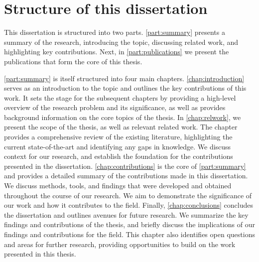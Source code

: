 \section{Structure of this dissertation}

This dissertation is structured into two parts.
\cref{part:summary} presents a summary of the research, introducing the topic, discussing related work, and highlighting key contributions.
Next, in \cref{part:publications} we present the publications that form the core of this thesis.

\cref{part:summary} is itself structured into four main chapters.
\cref{chap:introduction} serves as an introduction to the topic and outlines the key contributions of this work.
It sets the stage for the subsequent chapters by providing a high-level overview of the research problem and its significance, as well as provides background information on the core topics of the thesis.
In \cref{chap:relwork}, we present the scope of the thesis, as well as relevant related work.
The chapter provides a comprehensive review of the existing literature, highlighting the current state-of-the-art and identifying any gaps in knowledge.
We discuss context for our research, and establish the foundation for the contributions presented in the dissertation.
\cref{chap:contributions} is the core of \cref{part:summary} and provides a detailed summary of the contributions made in this dissertation.
We discuss methods, tools, and findings that were developed and obtained throughout the course of our research.
We aim to demonstrate the significance of our work and how it contributes to the field.
Finally, \cref{chap:conclusions} concludes the dissertation and outlines avenues for future research.
We summarize the key findings and contributions of the thesis, and briefly discuss the implications of our findings and contributions for the field.
This chapter also identifies open questions and areas for further research, providing opportunities to build on the work presented in this thesis.